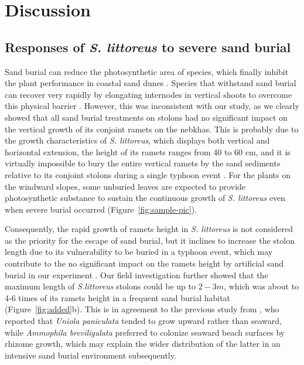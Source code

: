 \documentclass[]{interact}
\theoremstyle{plain}%
\theoremstyle{definition}
\theoremstyle{remark}
\begin{document}
\section{Discussion}

\subsection{Responses of \textit{S. littoreus} to severe sand burial}

Sand burial can reduce the photosynthetic area of species, which finally inhibit the plant performance in coastal sand dunes \citep{hespEcologicalProcessesPlant1991, brownMechanismsSurvivingBurial2018}. Species that withstand sand burial can recover very rapidly by elongating internodes in vertical shoots to overcome this physical barrier \citep{frosiniGlobalChangeResponse2012,keijsersModelingBiogeomorphicEvolution2016, quEffectsSandBurial2017,enriquezAssessingBeachDune2019}. However, this was inconsistent with our study, as we clearly showed that all sand burial treatments on stolons had no significant impact on the vertical growth of its conjoint ramets on the nebkhas. This is probably due to the growth characteristics of \textit{S. littoreus}, which displays both vertical and horizontal extension, the height of its ramets ranges from 40 to 60 cm, and it is virtually impossible to bury the entire vertical ramets by the sand sediments relative to its conjoint stolons during a single typhoon event \citep{yangDiurnalvariationcharacteristics2017}. For the plants on the windward slopes, some unburied leaves are expected to provide photosynthetic substance to sustain the continuous growth of \textit{S. littoreus} even when severe burial occurred (Figure~\ref{fig:sample-pic}). 

Consequently, the rapid growth of ramets height in \textit{S. littoreus} is not considered as the priority for the escape of sand burial, but it inclines to increase the stolon length due to its vulnerability to be buried in a typhoon event, which may contribute to the no significant impact on the ramets height by artificial sand burial in our experiment \citep{maunAdaptationsEnhancingSurvival1994}. Our field investigation further showed that the maximum length of \textit{S.littoreus} stolons could be up to $2-3 m$, which was about to 4-6 times of its ramets height in a frequent sand burial habitat (Figure~\ref{fig:added}b). This is in agreement to the previous study from \citet{woodhouseEffectSpeciesDune1977}, who reported that \textit{Uniola paniculata} tended to grow upward rather than seaward, while \textit{Ammophila breviligulata} preferred to colonize seaward beach surfaces by rhizome growth, which may explain the wider distribution of the latter in an intensive sand burial environment subsequently. 
\end{document}
